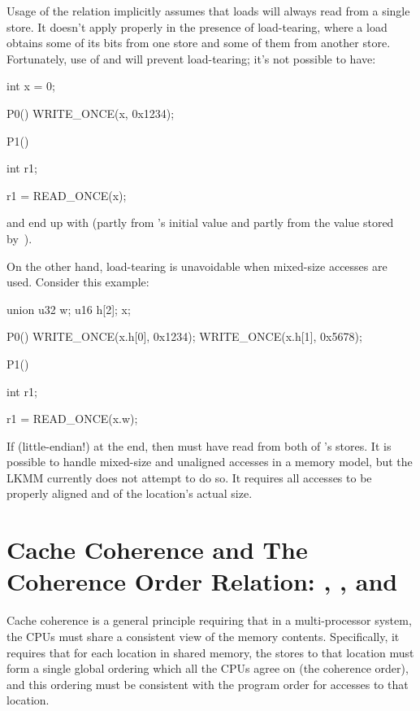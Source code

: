 Usage of the  relation implicitly assumes that loads will always
read from a single store.
It doesn't apply properly in the presence of load-tearing, where a
load obtains some of its bits from one store and some of them from
another store.
Fortunately, use of  and  will
prevent load-tearing; it's not possible to have:

\begin{VerbatimU}
	int x = 0;

	P0()
	{
		WRITE_ONCE(x, 0x1234);
	}

	P1()
	{
		int r1;

		r1 = READ_ONCE(x);
	}
\end{VerbatimU}

\noindent%
and end up with  (partly from 's initial value
and partly from the value stored by~).

On the other hand, load-tearing is unavoidable when mixed-size
accesses are used.
Consider this example:

\begin{VerbatimU}
	union {
		u32	w;
		u16	h[2];
	} x;

	P0()
	{
		WRITE_ONCE(x.h[0], 0x1234);
		WRITE_ONCE(x.h[1], 0x5678);
	}

	P1()
	{
		int r1;

		r1 = READ_ONCE(x.w);
	}
\end{VerbatimU}

If  (little-endian{!}) at the end, then 
must have read from both of 's stores.
It is possible to handle mixed-size and unaligned accesses in a memory
model, but the LKMM currently does not attempt to do so.
It requires all accesses to be properly aligned and of the location's
actual size.


\section{Cache Coherence and The Coherence Order Relation: , , and }
\label{sec:docs:explanation:Cache Coherence and The Coherence Order Relation}

Cache coherence is a general principle requiring that in a
multi-processor system, the CPUs must share a consistent view of the
memory contents.
Specifically, it requires that for each location in shared memory,
the stores to that location must form a single global ordering which
all the CPUs agree on (the coherence order), and this ordering must be
consistent with the program order for accesses to that location.

